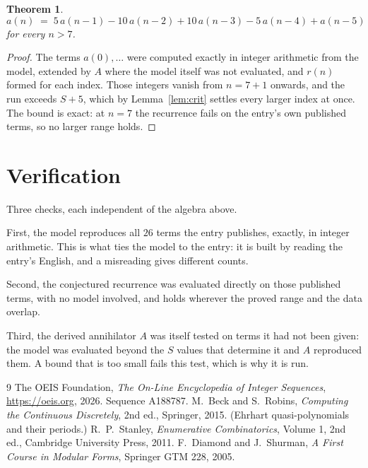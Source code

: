 \documentclass[11pt,a4paper]{article}
\theoremstyle{plain}
\newtheorem{theorem}{Theorem}
\theoremstyle{definition}
\begin{document}
\begin{theorem}
\[
a(n)\;=\;5\,a(n-1) - 10\,a(n-2) + 10\,a(n-3) - 5\,a(n-4) + a(n-5)
\]
for every $n>7$.
\end{theorem}

\begin{proof}
The terms $a(0),\dots$ were computed exactly in integer arithmetic from the model, extended by
$A$ where the model itself was not evaluated, and $r(n)$ formed for each index. Those integers
vanish from $n=7+1$ onwards, and the run exceeds $S+5$, which by
Lemma~\ref{lem:crit} settles every larger index at once. The bound is exact: at $n=7$ the recurrence fails on the entry's own published terms, so no larger range holds.
\end{proof}

\section{Verification}

Three checks, each independent of the algebra above.

First, the model reproduces all $26$ terms the entry publishes, exactly, in integer
arithmetic. This is what ties the model to the entry: it is built by reading the entry's
English, and a misreading gives different counts.

Second, the conjectured recurrence was evaluated directly on those published terms, with no
model involved, and holds wherever the proved range and the data overlap.

Third, the derived annihilator $A$ was itself tested on terms it had not been given: the model
was evaluated beyond the $S$ values that determine it and $A$ reproduced them. A bound that is
too small fails this test, which is why it is run.

\begin{thebibliography}{9}
 The OEIS Foundation, \emph{The On-Line Encyclopedia of Integer
Sequences}, \url{https://oeis.org}, 2026. Sequence A188787.
 M.~Beck and S.~Robins, \emph{Computing the Continuous Discretely},
2nd ed., Springer, 2015. (Ehrhart quasi-polynomials and their periods.)
 R.~P.~Stanley, \emph{Enumerative Combinatorics}, Volume 1, 2nd ed.,
Cambridge University Press, 2011.
 F.~Diamond and J.~Shurman, \emph{A First Course in Modular Forms},
Springer GTM 228, 2005.
\end{thebibliography}
\end{document}
